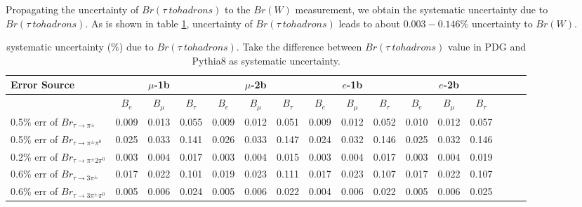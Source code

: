 Propagating the uncertainty of $Br(\tau\ to  hadrons)$ to the $Br(W)$
measurement, we obtain the systematic uncertainty due to $Br(\tau\ to
hadrons)$. As is shown in table \ref{tab:syst_tauhReweighting},
uncertainty of $Br(\tau\ to  hadrons)$ leads to about $0.003 - 0.146 \%$
uncertainty to $Br(W)$.

\begin{table}[p]
  \centering
  \scriptsize
  \begin{tabular}{|l|ccc|ccc|ccc|ccc|ccc|}
  \hline
  Error Source & \multicolumn{3}{c|}{$\mu$-1b} & \multicolumn{3}{c|}{$\mu$-2b} & \multicolumn{3}{c|}{$e$-1b} & \multicolumn{3}{c|}{$e$-2b} \\
  \hline
                & $B_e$ & $B_\mu$ & $B_\tau$ & $B_e$ & $B_\mu$ & $B_\tau$ & $B_e$ & $B_\mu$ & $B_\tau$ & $B_e$ & $B_\mu$ & $B_\tau$ \\
  \hline
  0.5$\%$ err of $Br_{\tau\to\pi^\pm}$       & 0.009 & 0.013 & 0.055 & 0.009 & 0.012 & 0.051 & 0.009 & 0.012 & 0.052 & 0.010 & 0.012 & 0.057 \\ 
  0.5$\%$ err of $Br_{\tau\to\pi^\pm\pi^0}$  & 0.025 & 0.033 & 0.141 & 0.026 & 0.033 & 0.147 & 0.024 & 0.032 & 0.146 & 0.025 & 0.032 & 0.146 \\ 
  0.2$\%$ err of $Br_{\tau\to\pi^\pm2\pi^0}$ & 0.003 & 0.004 & 0.017 & 0.003 & 0.004 & 0.015 & 0.003 & 0.004 & 0.017 & 0.003 & 0.004 & 0.019 \\ 
  0.6$\%$ err of $Br_{\tau\to3\pi^\pm}$      & 0.017 & 0.022 & 0.101 & 0.019 & 0.023 & 0.111 & 0.017 & 0.023 & 0.107 & 0.017 & 0.022 & 0.107 \\ 
  0.6$\%$ err of $Br_{\tau\to3\pi^\pm\pi^0}$ & 0.005 & 0.006 & 0.024 & 0.005 & 0.006 & 0.022 & 0.004 & 0.006 & 0.022 & 0.005 & 0.006 & 0.025 \\ 
  \hline
  \end{tabular}
  \caption{ systematic uncertainty ($\%$) due to $Br(\tau\ to  hadrons)$. Take the difference 
            between $Br(\tau\ to  hadrons)$ value in PDG and Pythia8 as systematic uncertainty.
            }
  \label{tab:syst_tauhReweighting}
\end{table}
\FloatBarrier